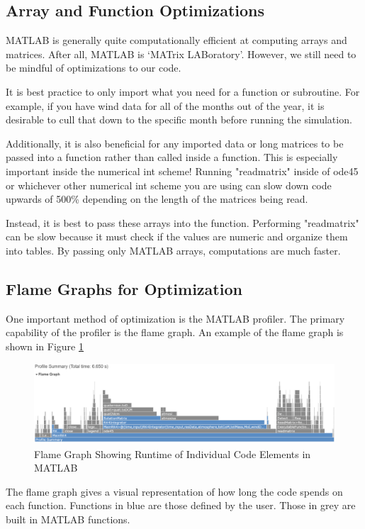 \documentclass[12pt]{report}
\begin{document}
\subsection{Array and Function Optimizations}
MATLAB is generally quite computationally efficient at computing arrays and matrices. After all, MATLAB is ‘MATrix LABoratory’. However, we still need to be mindful of optimizations to our code.

It is best practice to only import what you need for a function or subroutine. For example, if you have wind data for all of the months out of the year, it is desirable to cull that down to the specific month before running the simulation.

Additionally, it is also beneficial for any imported data or long matrices to be passed into a function rather than called inside a function. This is especially important inside the \gls{numerical int} scheme! Running "readmatrix" inside of ode45 or whichever other \gls{numerical int} scheme you are using can slow down code upwards of 500\% depending on the length of the matrices being read.

Instead, it is best to pass these arrays into the function. Performing "readmatrix" can be slow because it must check if the values are numeric and organize them into tables. By passing only MATLAB arrays, computations are much faster.
\subsection{Flame Graphs for Optimization}
One important method of optimization is the MATLAB profiler. The primary capability of the profiler is the flame graph. An example of the flame graph is shown in Figure \ref{fig:flame1}

\begin{figure}[ht]
    \centering
    \includegraphics[width=\linewidth]{Images/FlameGraph1.png}
    \caption{Flame Graph Showing Runtime of Individual Code Elements in MATLAB}
    \label{fig:flame1}
\end{figure}

The flame graph gives a visual representation of how long the code spends on each function. Functions in blue are those defined by the user. Those in grey are built in MATLAB functions.
\end{document}
